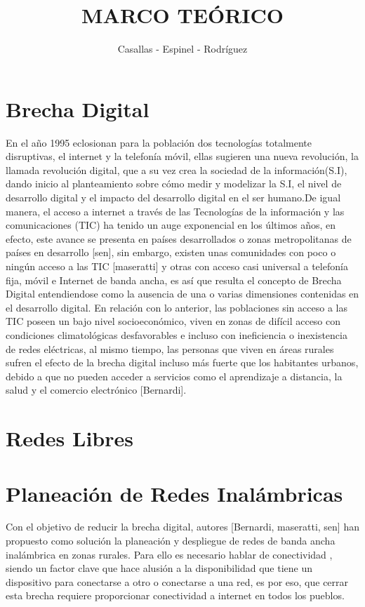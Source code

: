 \documentclass[]{article}
\title{MARCO TEÓRICO}
\author{Casallas - Espinel - Rodríguez}
\date{}
\begin{document}
\maketitle

\section{Brecha Digital}\label{brecha-digital}

En el año 1995 eclosionan para la población dos tecnologías totalmente
disruptivas, el internet y la telefonía móvil, ellas sugieren una nueva
revolución, la llamada revolución digital, que a su vez crea la sociedad
de la información(S.I), dando inicio al planteamiento sobre cómo medir y
modelizar la S.I, el nivel de desarrollo digital y el impacto del
desarrollo digital en el ser humano.De igual manera, el acceso a
internet a través de las Tecnologías de la información y las
comunicaciones (TIC) ha tenido un auge exponencial en los últimos años,
en efecto, este avance se presenta en países desarrollados o zonas
metropolitanas de países en desarrollo {[}sen{]}, sin embargo, existen
unas comunidades con poco o ningún acceso a las TIC {[}maseratti{]} y
otras con acceso casi universal a telefonía fija, móvil e Internet de
banda ancha, es así que resulta el concepto de Brecha Digital
entendiendose como la ausencia de una o varias dimensiones contenidas en
el desarrollo digital. En relación con lo anterior, las poblaciones sin
acceso a las TIC poseen un bajo nivel socioeconómico, viven en zonas de
difícil acceso con condiciones climatológicas desfavorables e incluso
con ineficiencia o inexistencia de redes eléctricas, al mismo tiempo,
las personas que viven en áreas rurales sufren el efecto de la brecha
digital incluso más fuerte que los habitantes urbanos, debido a que no
pueden acceder a servicios como el aprendizaje a distancia, la salud y
el comercio electrónico {[}Bernardi{]}.

\section{Redes Libres}\label{redes-libres}

\section{Planeación de Redes
Inalámbricas}\label{planeaciuxf3n-de-redes-inaluxe1mbricas}

Con el objetivo de reducir la brecha digital, autores {[}Bernardi,
maseratti, sen{]} han propuesto como solución la planeación y despliegue
de redes de banda ancha inalámbrica en zonas rurales. Para ello es
necesario hablar de conectividad , siendo un factor clave que hace
alusión a la disponibilidad que tiene un dispositivo para conectarse a
otro o conectarse a una red, es por eso, que cerrar esta brecha requiere
proporcionar conectividad a internet en todos los pueblos.
\end{document}

